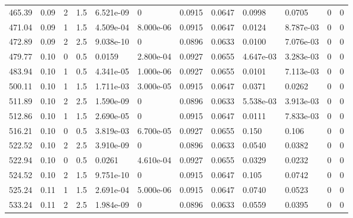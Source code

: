 \documentclass[preview]{standalone}
\begin{document}
{{{\begin{tabular}{L{1.2cm}C{1.2cm} C{0.3cm}C{0.5cm} C{1.4cm}C{1.4cm} C{1.4cm}C{1.4cm} C{1.6cm}C{1.6cm} C{1.6cm}C{1.6cm}}
  465.39  &  0.09  & 2     & 1.5 &  6.521e-09  & 0  &  0.0915&   0.0647& 0.0998 & 0.0705   &  0 & 0  \\ 
  471.04  &  0.09  & 1     & 1.5 &  4.509e-04  & 8.000e-06  &  0.0915&   0.0647& 0.0124 & 8.787e-03   &  0 & 0  \\ 
  472.89  &  0.09  & 2     & 2.5 &  9.038e-10  & 0  &  0.0896&   0.0633& 0.0100 & 7.076e-03   &  0 & 0  \\ 
  479.77  &  0.10  & 0     & 0.5 &  0.0159  & 2.800e-04  &  0.0927&   0.0655& 4.647e-03 & 3.283e-03   &  0 & 0  \\ 
  483.94  &  0.10  & 1     & 0.5 &  4.341e-05  & 1.000e-06  &  0.0927&   0.0655& 0.0101 & 7.113e-03   &  0 & 0  \\ 
  500.11  &  0.10  & 1     & 1.5 &  1.711e-03  & 3.000e-05  &  0.0915&   0.0647& 0.0371 & 0.0262   &  0 & 0  \\ 
  511.89  &  0.10  & 2     & 2.5 &  1.590e-09  & 0  &  0.0896&   0.0633& 5.538e-03 & 3.913e-03   &  0 & 0  \\ 
  512.86  &  0.10  & 1     & 1.5 &  2.690e-05  & 0  &  0.0915&   0.0647& 0.0111 & 7.833e-03   &  0 & 0  \\ 
  516.21  &  0.10  & 0     & 0.5 &  3.819e-03  & 6.700e-05  &  0.0927&   0.0655& 0.150 & 0.106   &  0 & 0  \\ 
  522.52  &  0.10  & 2     & 2.5 &  3.910e-09  & 0  &  0.0896&   0.0633& 0.0540 & 0.0382   &  0 & 0  \\ 
  522.94  &  0.10  & 0     & 0.5 &  0.0261  & 4.610e-04  &  0.0927&   0.0655& 0.0329 & 0.0232   &  0 & 0  \\ 
  524.52  &  0.10  & 2     & 1.5 &  9.751e-10  & 0  &  0.0915&   0.0647& 0.105 & 0.0742   &  0 & 0  \\ 
  525.24  &  0.11  & 1     & 1.5 &  2.691e-04  & 5.000e-06  &  0.0915&   0.0647& 0.0740 & 0.0523   &  0 & 0  \\ 
  533.24  &  0.11  & 2     & 2.5 &  1.984e-09  & 0  &  0.0896&   0.0633& 0.0559 & 0.0395   &  0 & 0  \\ 
\hline 
\end{tabular} 

}}}
\end{document}

